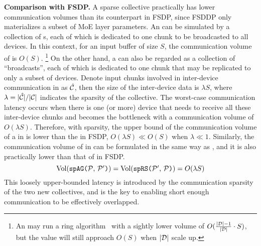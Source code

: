 \textbf{Comparison with FSDP.}
A sparse collective practically has lower communication volumes than its counterpart in FSDP, since FSDDP only materializes a subset of MoE layer parameters. 
An \collag can be simulated by a collection of {\collbc}s, each of which is dedicated to one chunk to be broadcasted to all devices. In this context, for an input buffer of size $S$, the communication volume of \collsag is $O(S)$.
\footnote{
    An \collag may run a ring algorithm~\cite{chan2006collective} with a sightly lower volume of $O(\frac{|\mathcal{D}|-1}{|\mathcal{D}|}\cdot S)$, but the value will still approach $O(S)$ when $|\mathcal{D}|$ scale up.
}
On the other hand, a \collsag can also be regarded as a collection of ``broadcasts'', each of which is dedicated to one chunk that may be replicated to only a subset of devices. 
Denote input chunks involved in inter-device communication in \collsag as $\mathcal{\hat{C}}$, then the size of the inter-device data is $\lambda S$, where $\lambda = |\mathcal{\hat{C}}| / |\mathcal{C}|$ indicates the sparsity of the collective.
The worst-case communication latency occurs when there is one (or more) device that needs to receive all these inter-device chunks and becomes the bottleneck with a communication volume of $O(\lambda S)$.
Therefore, with sparsity, the upper bound of the communication volume of a \collsag in \yyy is lower than the \collag in FSDP, \ie $O(\lambda S) \ll O(S)$ when $\lambda \ll 1$.
Similarly, the communication volume of \collsrs in \yyy can be formulated in the same way as , and it is also practically lower than that of \collrs in FSDP.
\begin{equation}\label{eq:vol_spcoll}
    \text{Vol}(\mbox{\texttt{spAG(}$\mathcal{P}$, $\mathcal{P}'$\texttt{)}}) 
    = \text{Vol}(\mbox{\texttt{spRS(}$\mathcal{P}'$, $\mathcal{P}$\texttt{)}}) 
    = O(\lambda S) \\
\end{equation}
This loosely upper-bounded latency is introduced by the communication sparsity of the two new collectives, and is the key to enabling short enough communication to be effectively overlapped.

